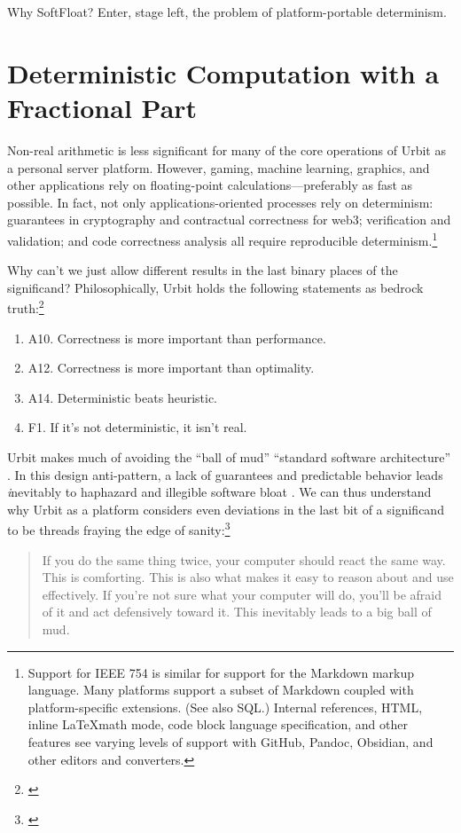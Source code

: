 \documentclass[twoside]{article}
\begin{document}
Why SoftFloat?  Enter, stage left, the problem of platform-portable determinism.


\section{Deterministic Computation with a Fractional Part}

Non-real arithmetic is less significant for many of the core operations of Urbit as a personal server platform.  However, gaming, machine learning, graphics, and other applications rely on floating-point calculations—preferably as fast as possible.  In fact, not only applications-oriented processes rely on determinism:  guarantees in cryptography and contractual correctness for web3; verification and validation; and code correctness analysis all require reproducible determinism.\footnote{Support for IEEE 754 is similar for support for the Markdown markup language.  Many platforms support a subset of Markdown coupled with platform-specific extensions.  (See also SQL.)  Internal references, HTML, inline \LaTeX math mode, code block language specification, and other features see varying levels of support with GitHub, Pandoc, Obsidian, and other editors and converters.}

Why can't we just allow different results in the last binary places of the significand?  Philosophically, Urbit holds the following statements as bedrock truth:\footnote{\citet{Monk2020}}

\begin{enumerate}
  \item  A10.  Correctness is more important than performance.
  \item  A12.  Correctness is more important than optimality.
  \item  A14.  Deterministic beats heuristic.
  \item  F1.  If it's not deterministic, it isn't real.
\end{enumerate}

Urbit makes much of avoiding the “ball of mud” “standard software architecture” \citep{Foote1999}.  In this design anti-pattern, a lack of guarantees and predictable behavior leads {\emph inevitably} to haphazard and illegible software bloat \citep{Foote1999}.  We can thus understand why Urbit as a platform considers even deviations in the last bit of a significand to be threads fraying the edge of sanity:\footnote{\citet{Monk2020a}}

\begin{quote}
If you do the same thing twice, your computer should react the same way.  This is comforting.  This is also what makes it easy to reason about and use effectively.  If you're not sure what your computer will do, you'll be afraid of it and act defensively toward it.  This inevitably leads to a big ball of mud.
\end{quote}
\end{document}
